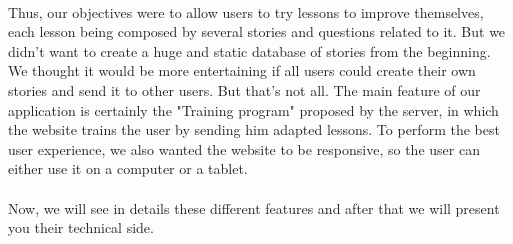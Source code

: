 \paragraph{}
Thus, our objectives were to allow users to try lessons to improve themselves, each lesson being composed by several stories and questions related to it. But we didn't want to create a huge and static database of stories from the beginning. We thought it would be more entertaining if all users could create their own stories and send it to other users. But that's not all. The main feature of our application is certainly the "Training program" proposed by the server, in which the website trains the user by sending him adapted lessons.
To perform the best user experience, we also wanted the website to be responsive, so the user can either use it on a computer or a tablet. 


\paragraph{}
Now, we will see in details these different features and after that we will present you their technical side.
